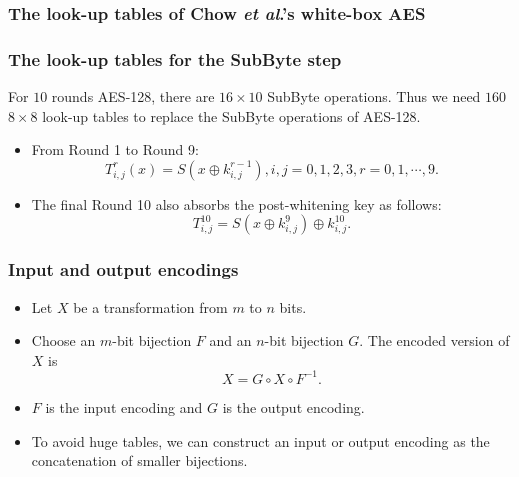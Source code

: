 \documentclass{beamer}
\begin{document}
\frame
{
\frametitle{The look-up tables of Chow \textit{et al}.'s white-box AES}
\begin{center}
\end{center}
}

\frame
{
\frametitle{The look-up tables for the SubByte step}
For $10$ rounds AES-128, there are $16\times 10$ SubByte operations. Thus we need $160$ $8\times 8$ look-up tables to replace the SubByte operations of AES-128.
\begin{itemize}
\item From Round 1 to Round 9:
\[T^{r}_{i,j}(x)=S(x\oplus k^{r-1}_{i,j}), i,j={0,1,2,3},r={0,1,\cdots, 9}.\]

\item The final Round 10 also absorbs the post-whitening key as follows:
    \[T^{10}_{i,j}=S(x\oplus k^{9}_{i,j})\oplus k^{10}_{i,j}.\]
\end{itemize}
}

\frame
{
\frametitle{Input and output encodings}
\begin{itemize}
\item Let $X$ be a transformation from $m$ to $n$ bits.
\item Choose an $m$-bit bijection $F$ and an $n$-bit bijection $G$. The encoded version of $X$ is
  \[X = G \circ X \circ F^{-1}.\]
\item $F$ is \textcolor[rgb]{1.00,0.00,0.00}{the input encoding} and $G$ is \textcolor[rgb]{1.00,0.00,0.00}{the output encoding}.
\item To avoid huge tables, we can construct an input or output encoding as the concatenation of smaller bijections.
\end{itemize}
}
\end{document}
